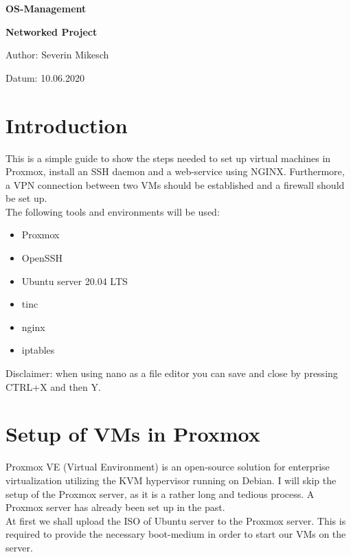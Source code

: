\documentclass[10pt,a4paper]{article}
\begin{document}
\huge
\begin{center}
{\bf OS-Management}\par
{\bf Networked Project}\par
\vspace{5cm}
\end{center}

\large
Author: Severin Mikesch\par
\vspace{0.8cm}
Datum: 10.06.2020\par
\vspace{0.8cm}

\normalsize


\newpage
\section{Introduction}
This is a simple guide to show the steps needed to set up virtual machines in Proxmox, install an SSH daemon and a web-service using NGINX. Furthermore, a VPN connection between two VMs should be established and a firewall should be set up.
\\
The following tools and environments will be used:
\begin{itemize}
\item Proxmox
\item OpenSSH
\item Ubuntu server 20.04 LTS
\item tinc
\item nginx
\item iptables
\end{itemize}

Disclaimer: when using nano as a file editor you can save and close by pressing CTRL+X and then Y.

\newpage
\section{Setup of VMs in Proxmox}
Proxmox VE (Virtual Environment) is an open-source solution for enterprise virtualization utilizing the KVM hypervisor running on Debian. I will skip the setup of the Proxmox server, as it is a rather long and tedious process. A Proxmox server has already been set up in the past.
\\
At first we shall upload the ISO of Ubuntu server to the Proxmox server. This is required to provide the necessary boot-medium in order to start our VMs on the server.
\end{document}
